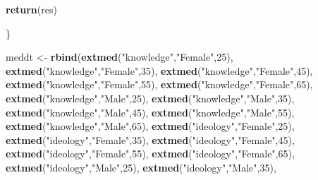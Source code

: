 \documentclass[
]{article}
\newenvironment{Shaded}{\begin{snugshade}}{\end{snugshade}}
\newcommand{\DecValTok}[1]{\textcolor[rgb]{0.00,0.00,0.81}{#1}}
\newcommand{\KeywordTok}[1]{\textcolor[rgb]{0.13,0.29,0.53}{\textbf{#1}}}
\newcommand{\NormalTok}[1]{#1}
\newcommand{\StringTok}[1]{\textcolor[rgb]{0.31,0.60,0.02}{#1}}
\begin{document}
\begin{Shaded}
\begin{Highlighting}[]
  \KeywordTok{return}\NormalTok{(res)}
  
\NormalTok{\}}

\NormalTok{meddt <-}\StringTok{ }\KeywordTok{rbind}\NormalTok{(}\KeywordTok{extmed}\NormalTok{(}\StringTok{"knowledge"}\NormalTok{,}\StringTok{"Female"}\NormalTok{,}\DecValTok{25}\NormalTok{),}
               \KeywordTok{extmed}\NormalTok{(}\StringTok{"knowledge"}\NormalTok{,}\StringTok{"Female"}\NormalTok{,}\DecValTok{35}\NormalTok{),}
               \KeywordTok{extmed}\NormalTok{(}\StringTok{"knowledge"}\NormalTok{,}\StringTok{"Female"}\NormalTok{,}\DecValTok{45}\NormalTok{),}
               \KeywordTok{extmed}\NormalTok{(}\StringTok{"knowledge"}\NormalTok{,}\StringTok{"Female"}\NormalTok{,}\DecValTok{55}\NormalTok{),}
               \KeywordTok{extmed}\NormalTok{(}\StringTok{"knowledge"}\NormalTok{,}\StringTok{"Female"}\NormalTok{,}\DecValTok{65}\NormalTok{),}
               \KeywordTok{extmed}\NormalTok{(}\StringTok{"knowledge"}\NormalTok{,}\StringTok{"Male"}\NormalTok{,}\DecValTok{25}\NormalTok{),}
               \KeywordTok{extmed}\NormalTok{(}\StringTok{"knowledge"}\NormalTok{,}\StringTok{"Male"}\NormalTok{,}\DecValTok{35}\NormalTok{),}
               \KeywordTok{extmed}\NormalTok{(}\StringTok{"knowledge"}\NormalTok{,}\StringTok{"Male"}\NormalTok{,}\DecValTok{45}\NormalTok{),}
               \KeywordTok{extmed}\NormalTok{(}\StringTok{"knowledge"}\NormalTok{,}\StringTok{"Male"}\NormalTok{,}\DecValTok{55}\NormalTok{),}
               \KeywordTok{extmed}\NormalTok{(}\StringTok{"knowledge"}\NormalTok{,}\StringTok{"Male"}\NormalTok{,}\DecValTok{65}\NormalTok{),}
               \KeywordTok{extmed}\NormalTok{(}\StringTok{"ideology"}\NormalTok{,}\StringTok{"Female"}\NormalTok{,}\DecValTok{25}\NormalTok{),}
               \KeywordTok{extmed}\NormalTok{(}\StringTok{"ideology"}\NormalTok{,}\StringTok{"Female"}\NormalTok{,}\DecValTok{35}\NormalTok{),}
               \KeywordTok{extmed}\NormalTok{(}\StringTok{"ideology"}\NormalTok{,}\StringTok{"Female"}\NormalTok{,}\DecValTok{45}\NormalTok{),}
               \KeywordTok{extmed}\NormalTok{(}\StringTok{"ideology"}\NormalTok{,}\StringTok{"Female"}\NormalTok{,}\DecValTok{55}\NormalTok{),}
               \KeywordTok{extmed}\NormalTok{(}\StringTok{"ideology"}\NormalTok{,}\StringTok{"Female"}\NormalTok{,}\DecValTok{65}\NormalTok{),}
               \KeywordTok{extmed}\NormalTok{(}\StringTok{"ideology"}\NormalTok{,}\StringTok{"Male"}\NormalTok{,}\DecValTok{25}\NormalTok{),}
               \KeywordTok{extmed}\NormalTok{(}\StringTok{"ideology"}\NormalTok{,}\StringTok{"Male"}\NormalTok{,}\DecValTok{35}\NormalTok{),}

\end{Highlighting}
\end{Shaded}
\end{document}
